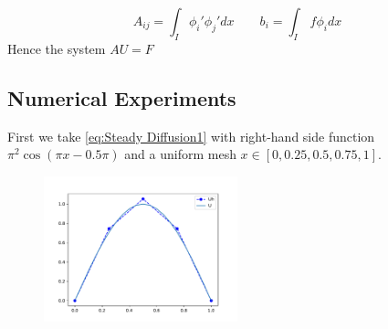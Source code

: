 \documentclass{uonmathreport}
\theoremstyle{definition}
\theoremstyle{problem}
\theoremstyle{theorem}
\begin{document}
\begin{equation*} 
A_{ij} = \int_I \phi_i' \phi_j' dx \quad \quad
b_i = \int_I  \, f\phi_i dx
\end{equation*}
\vspace{2mm} %
Hence the system $AU = F$		


\subsection{Numerical Experiments} \label{subsec:Numerical1}

First we take \ref{eq:Steady Diffusion1} with right-hand side function $\pi^2 \cos(\pi x - 0.5 \pi )$ and a uniform mesh $ x \in [0, 0.25, 0.5, 0.75, 1]$.


\begin{figure}[h]
   \includegraphics[width=0.5\textwidth]{EllipticPDE2.pdf}
   
 \label{fig:eliptic1}
\end{figure}
\end{document}
